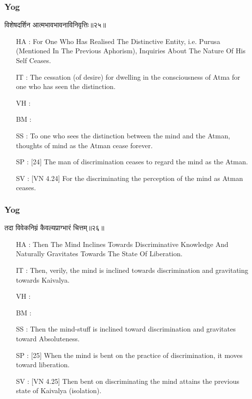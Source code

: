 \begin{frame}[fragile]\frametitle{Yog}
\begin{sanskrit}
विशेषदर्शिन आत्मभावभावनाविनिवृत्तिः॥२५॥
\end{sanskrit}

	\begin{itemize}
	\item [HA]: For One Who Has Realised The Distinctive Entity, i.e. Purusa (Mentioned In The Previous Aphorism), Inquiries About The Nature Of His Self Ceases.
	\item [IT]: The cessation (of desire) for dwelling in the consciousness of Atma for one who has seen the distinction.
	\item [VH]: 
	\item [BM]: 
	\item [SS]: To one who sees the distinction between the mind and the Atman, thoughts of mind as the Atman cease forever.
	\item [SP]: [24] The man of discrimination ceases to regard the mind as the Atman.
	\item [SV]: [VN 4.24] For the discriminating the perception of the mind as Atman ceases. 
	\end{itemize}
\end{frame}


\begin{frame}[fragile]\frametitle{Yog}
\begin{sanskrit}
तदा विवेकनिम्नं कैवल्यप्राग्भारं चित्तम्॥२६॥
\end{sanskrit}

	\begin{itemize}
	\item [HA]: Then The Mind Inclines Towards Discriminative Knowledge And Naturally Gravitates Towards The State Of Liberation.
	\item [IT]: Then, verily, the mind is inclined towards discrimination and gravitating towards Kaivalya.
	\item [VH]: 
	\item [BM]: 
	\item [SS]: Then the mind-stuff is inclined toward discrimination and gravitates toward Absoluteness.
	\item [SP]: [25] When the mind is bent on the practice of discrimination, it moves toward liberation.
	\item [SV]: [VN 4.25] Then bent on discriminating the mind attains the previous state of Kaivalya (isolation). 
	\end{itemize}
\end{frame}


